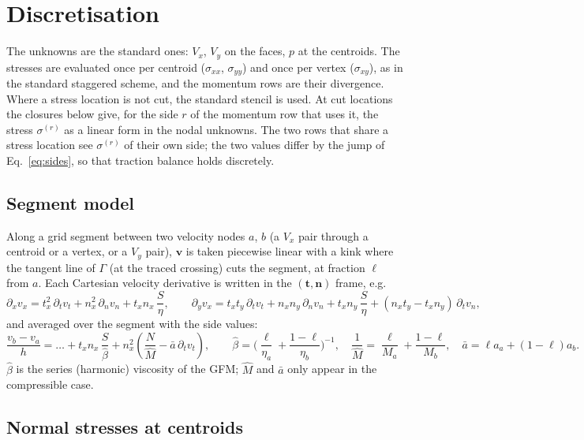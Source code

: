 \documentclass[11pt,a4paper]{article}
\begin{document}
\section{Discretisation}\label{sec:disc}

The unknowns are the standard ones: $V_x$, $V_y$ on the faces, $p$ at the centroids. The
stresses are evaluated once per centroid ($\sigma_{xx}$, $\sigma_{yy}$) and once per vertex
($\sigma_{xy}$), as in the standard staggered scheme, and the momentum rows are their
divergence. Where a stress location is not cut, the standard stencil is used. At cut locations
the closures below give, for the side $r$ of the momentum row that uses it, the stress
$\sigma^{(r)}$ as a linear form in the nodal unknowns. The two rows that share a stress
location see $\sigma^{(r)}$ of their own side; the two values differ by the jump of
Eq.~\eqref{eq:sides}, so that traction balance holds discretely.

\subsection*{Segment model}

Along a grid segment between two velocity nodes $a$, $b$ (a $V_x$ pair through a centroid or a
vertex, or a $V_y$ pair), $\mathbf v$ is taken piecewise linear with a kink where the tangent
line of $\Gamma$ (at the traced crossing) cuts the segment, at fraction $\ell$ from $a$. Each
Cartesian velocity derivative is written in the $(\mathbf t,\mathbf n)$ frame, e.g.
\[
\partial_x v_x=t_x^2\,\partial_t v_t+n_x^2\,\partial_n v_n+t_xn_x\,\frac{S}{\eta},\qquad
\partial_y v_x=t_xt_y\,\partial_t v_t+n_xn_y\,\partial_n v_n+t_xn_y\,\frac{S}{\eta}+(n_xt_y-t_xn_y)\,\partial_t v_n,
\]
and averaged over the segment with the side values:
\[
\frac{v_b-v_a}{h}=\ldots+t_xn_x\,\frac{S}{\hat\beta}+n_x^2\left(\frac{N}{\hat M}-\bar a\,\partial_tv_t\right),\qquad
\hat\beta=\Big(\frac{\ell}{\eta_a}+\frac{1-\ell}{\eta_b}\Big)^{-1},\quad
\frac1{\hat M}=\frac{\ell}{M_a}+\frac{1-\ell}{M_b},\quad \bar a=\ell a_a+(1-\ell)a_b .
\]
$\hat\beta$ is the series (harmonic) viscosity of the GFM; $\hat M$ and $\bar a$ only appear in
the compressible case.

\subsection*{Normal stresses at centroids}
\end{document}

